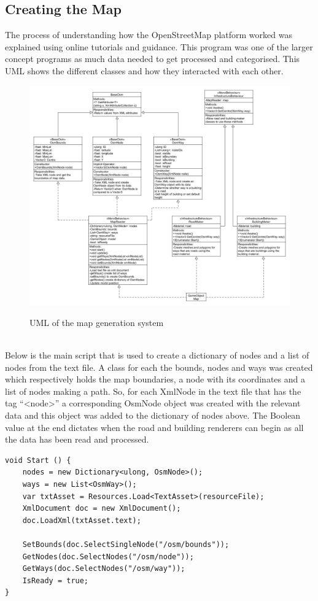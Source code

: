 \documentclass[a4paper]{report}
\begin{document}
\subsection{Creating the Map}
The process of understanding how the OpenStreetMap platform worked was explained using online tutorials and guidance. This program was one of the larger concept programs as much data needed to get processed and categorised. This UML shows the different classes and how they interacted with each other. \cite{Sloan}
\begin{figure}[h]
\includegraphics[scale=0.35]{"Map UML"}
\label{Figure 2: UML of processing map}
\caption{UML of the map generation system}
\end{figure}
\\Below is the main script that is used to create a dictionary of nodes and a list of nodes from the text file. A class for each the bounds, nodes and ways was created which respectively holds the map boundaries, a node with its coordinates and a list of nodes making a path. So, for each XmlNode in the text file that has the tag “<node>” a corresponding OsmNode object was created with the relevant data and this object was added to the dictionary of nodes above. The Boolean value at the end dictates when the road and building renderers can begin as all the data has been read and processed. 

\begin{Verbatim}[tabsize=4]
void Start () {
	nodes = new Dictionary<ulong, OsmNode>();
	ways = new List<OsmWay>();
	var txtAsset = Resources.Load<TextAsset>(resourceFile);
	XmlDocument doc = new XmlDocument();
	doc.LoadXml(txtAsset.text);
	
	SetBounds(doc.SelectSingleNode("/osm/bounds"));
	GetNodes(doc.SelectNodes("/osm/node"));
	GetWays(doc.SelectNodes("/osm/way"));
	IsReady = true;
}
\end{Verbatim}
\end{document}
